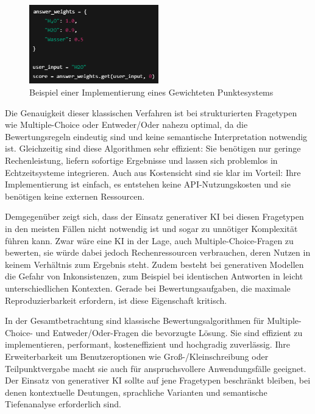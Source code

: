 \documentclass[a4paper,12pt]{article}
\begin{document}
\begin{figure}[H]
    \centering
    \includegraphics[width=0.5\textwidth]{Bilder/GewichtetePunkte}
   \caption{Beispiel einer Implementierung eines Gewichteten Punktesystems}
    \label{fig:transformer}
\end{figure}

Die Genauigkeit dieser klassischen Verfahren ist bei strukturierten Fragetypen wie Multiple-Choice oder Entweder/Oder nahezu optimal, da die Bewertungsregeln eindeutig sind und keine semantische Interpretation notwendig ist. Gleichzeitig sind diese Algorithmen sehr effizient: Sie benötigen nur geringe Rechenleistung, liefern sofortige Ergebnisse und lassen sich problemlos in Echtzeitsysteme integrieren. Auch aus Kostensicht sind sie klar im Vorteil: Ihre Implementierung ist einfach, es entstehen keine API-Nutzungskosten und sie benötigen keine externen Ressourcen.

Demgegenüber zeigt sich, dass der Einsatz generativer KI bei diesen Fragetypen in den meisten Fällen nicht notwendig ist und sogar zu unnötiger Komplexität führen kann. Zwar wäre eine KI in der Lage, auch Multiple-Choice-Fragen zu bewerten, sie würde dabei jedoch Rechenressourcen verbrauchen, deren Nutzen in keinem Verhältnis zum Ergebnis steht. Zudem besteht bei generativen Modellen die Gefahr von Inkonsistenzen, zum Beispiel bei identischen Antworten in leicht unterschiedlichen Kontexten. Gerade bei Bewertungsaufgaben, die maximale Reproduzierbarkeit erfordern, ist diese Eigenschaft kritisch.

In der Gesamtbetrachtung sind klassische Bewertungsalgorithmen für Multiple-Choice- und Entweder/Oder-Fragen die bevorzugte Lösung. Sie sind effizient zu implementieren, performant, kosteneffizient und hochgradig zuverlässig. Ihre Erweiterbarkeit um Benutzeroptionen wie Groß-/Kleinschreibung oder Teilpunktvergabe macht sie auch für anspruchsvollere Anwendungsfälle geeignet. Der Einsatz von generativer KI sollte auf jene Fragetypen beschränkt bleiben, bei denen kontextuelle Deutungen, sprachliche Varianten und semantische Tiefenanalyse erforderlich sind.
\end{document}

